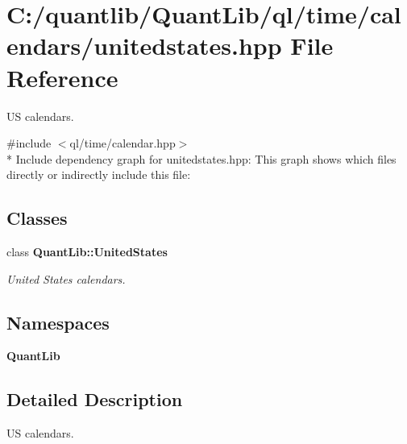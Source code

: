 \section{C\+:/quantlib/\+Quant\+Lib/ql/time/calendars/unitedstates.hpp File Reference}
\label{unitedstates_8hpp}


US calendars.  


{\ttfamily \#include $<$ql/time/calendar.\+hpp$>$}\\*
Include dependency graph for unitedstates.\+hpp\+:
This graph shows which files directly or indirectly include this file\+:
\subsection*{Classes}
\begin{DoxyCompactItemize}
\item 
class {\bf Quant\+Lib\+::\+United\+States}
\begin{DoxyCompactList}\small\item\em United States calendars. \end{DoxyCompactList}\end{DoxyCompactItemize}
\subsection*{Namespaces}
\begin{DoxyCompactItemize}
\item 
 {\bf Quant\+Lib}
\end{DoxyCompactItemize}


\subsection{Detailed Description}
US calendars. 

